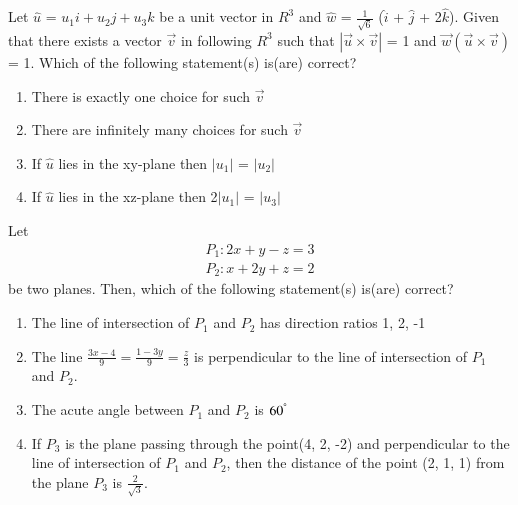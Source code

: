 \item Let $\hat{u}$ = $u_{1}i + u_{2}j + u_{3}k$ be a unit vector in $R^{3}$ and $\hat{w}$ = $\frac{1}{\sqrt{6}}$
($\hat{i}$ + $\hat{j}$ + 2$\hat{k}$). Given that there exists a vector $\overrightarrow{v}$ in following $R^{3}$ such that $|\overrightarrow{u} \times \overrightarrow{v}|$ = 1 and $\overrightarrow{w}(\overrightarrow{u} \times \overrightarrow{v})$ = 1. Which of the following statement(s) is(are) correct?
\begin{enumerate}
\item There is exactly one choice for such $\overrightarrow{v}$
\item There are infinitely many choices for such $\overrightarrow{v}$
\item If $\hat{u}$ lies in the xy-plane then $|u_1|$ = $|u_2|$
\item If $\hat{u}$ lies in the xz-plane then 2$|u_1|$ = $|u_3|$
\end{enumerate}

\item Let 
\begin{align*}
P_1: 2x + y - z = 3
\end{align*}
\begin{align*}
P_2: x + 2y + z = 2
\end{align*}
be two planes. Then, which of the following statement(s) is(are) correct?
\begin{enumerate}
\item The line of intersection of $P_1$ and $P_2$ has direction ratios 1, 2, -1
\item The line $\frac{3x - 4}{9} = \frac{1 - 3y}{9} = \frac{z}{3}$ is perpendicular to the line of intersection of $P_1$ and $P_2$.
\item The acute angle between $P_1$ and $P_2$ is $60^{\degree}$
\item If $P_3$ is the plane passing through the point(4, 2, -2) and perpendicular to the line of intersection of $P_1$ and $P_2$, then the distance of the point (2, 1, 1) from the plane $P_3$ is $\frac{2}{\sqrt{3}}$.
\end{enumerate}

